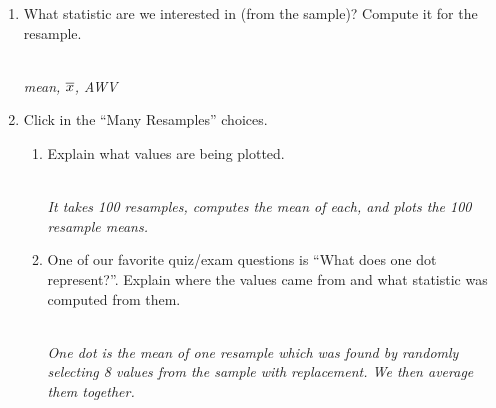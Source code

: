 \begin{enumerate}
\begin{enumerate}
      \begin{enumerate}
      \item Select one card at random, leave it out, and select
        another card.  Continue until you use all the cards.
      \item Select one card at random and write down its
        value. Replace it, reshuffle, and select another.  Continue
        until you've written down eight  values. 
      \end{enumerate}
\begin{students}
        \vspace{2cm}        
\end{students}
\begin{key}
\ \  \\
  {\it The second -- sampling With Replacement is what we are doing
    on the computer. The first way always gives the same resample
    mean -- they just change order. The second lets the resample mean vary.}
\end{key}

\item What statistic are we interested in (from the sample)?  Compute
  it for the resample. 
\begin{students}
        \vspace{1cm}        
\end{students}
\begin{key}
  \\{\it mean, $\overline{x}$, AWV}
\end{key}

\item  Click   in the ``Many Resamples'' choices.
  \begin{enumerate}
  \item  Explain  what values are being plotted.  
\begin{students}
        \vspace{2cm}        
\end{students}
\begin{key}
  \\{\it It takes  100 resamples, computes the mean of
    each, and plots the 100 resample means. }
\end{key}
  \item One of our favorite quiz/exam questions is ``What does one dot
    represent?''. Explain where the values came from and what
    statistic was computed from them. 
\begin{students}
        \vspace{3cm}        
\end{students}
\begin{key}
  \\{\it One dot is the mean of one resample which was found by
    randomly selecting 8  values from the sample with replacement. We
    then average them     together.}
\end{key}
\end{enumerate}


\end{enumerate}
\end{enumerate}
